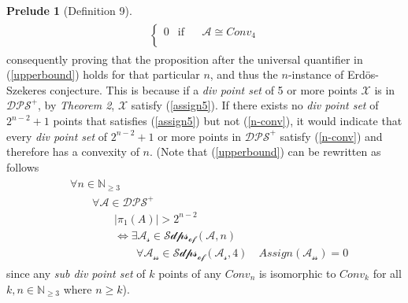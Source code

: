 \documentclass[11pt, oneside]{article}      %
\theoremstyle{definition}
\numberwithin{equation}{section}
\newcommand{\reff}[1]{(\ref{#1})}
\theoremstyle{c}
\newtheorem*{prelude}{Prelude}
\begin{document}
\begin{prelude}[Definition 9]
\begin{align}
\begin{split}
\begin{cases}
    0 & \text{if } \;  \quad  \mathscr{A} \cong Conv_4  \\
\end{cases}
\end{split}
\end{align}
consequently proving that the proposition after the universal quantifier in \reff{upperbound} holds for that particular $n$, and thus the $n$-instance of Erd{\"o}s-Szekeres conjecture. This is because if a \textit{div point set} of 5 or more points $\mathscr{X}$ is in $\mathscr{DPS}^+$, by \textit{Theorem 2}, $\mathscr{X}$ satisfy \reff{assign5}. If there exists no \textit{div point set} of $2^{n-2}+1$ points that satisfies \reff{assign5} but not \reff{n-conv}, it would indicate that every \textit{div point set} of $2^{n-2}+1$ or more points in $\mathscr{DPS}^+$ satisfy \reff{n-conv} and therefore has a convexity of $n$. (Note that \reff{upperbound} can be rewritten as follows
\begin{align}\label{upperbound2}
\begin{split}
&\forall n \in \mathbb{N}_{\geq 3} \\
& \qquad\forall \mathscr{A} \in \mathscr{DPS}^+ \\
& \qquad\qquad  |\pi_1(A)| > 2^{n-2} \\
&  \qquad\qquad \Leftrightarrow \exists \mathscr{A_s} \in \mathscr{Sdps_{of}}(\mathscr{A},n) \\
& \qquad \qquad \qquad \forall \mathscr{A_{ss}} \in \mathscr{Sdps_{of}}(\mathscr{A_s},4) \quad Assign(\mathscr{A_{ss}}) = 0
\end{split}
\end{align}
since any \textit{sub div point set} of $k$ points of any $Conv_n$ is isomorphic to $Conv_k$ for all $k,n \in \mathbb{N}_{\geq 3}$ where $n \geq k$).
\end{prelude}
\end{document}
